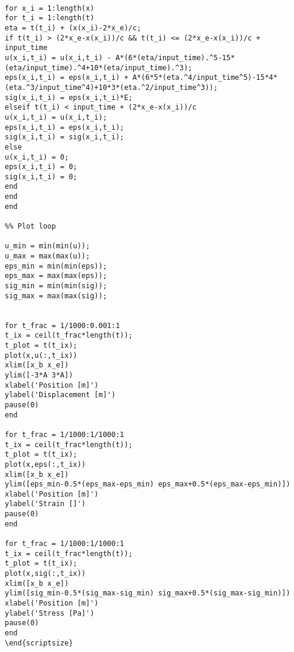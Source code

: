 \begin{lstlisting}[breaklines=true,frame=none]
%% Reflected wave
 
for x_i = 1:length(x)
for t_i = 1:length(t)
eta = t(t_i) + (x(x_i)-2*x_e)/c;
if t(t_i) > (2*x_e-x(x_i))/c && t(t_i) <= (2*x_e-x(x_i))/c + input_time
u(x_i,t_i) = u(x_i,t_i) - A*(6*(eta/input_time).^5-15*(eta/input_time).^4+10*(eta/input_time).^3);
eps(x_i,t_i) = eps(x_i,t_i) + A*(6*5*(eta.^4/input_time^5)-15*4*(eta.^3/input_time^4)+10*3*(eta.^2/input_time^3));
sig(x_i,t_i) = eps(x_i,t_i)*E;
elseif t(t_i) < input_time + (2*x_e-x(x_i))/c
u(x_i,t_i) = u(x_i,t_i);
eps(x_i,t_i) = eps(x_i,t_i);
sig(x_i,t_i) = sig(x_i,t_i);
else
u(x_i,t_i) = 0;
eps(x_i,t_i) = 0;
sig(x_i,t_i) = 0;
end
end
end
 
%% Plot loop
 
u_min = min(min(u));
u_max = max(max(u));
eps_min = min(min(eps));
eps_max = max(max(eps));
sig_min = min(min(sig));
sig_max = max(max(sig));
 
 
for t_frac = 1/1000:0.001:1
t_ix = ceil(t_frac*length(t));
t_plot = t(t_ix);
plot(x,u(:,t_ix))
xlim([x_b x_e])
ylim([-3*A 3*A])
xlabel('Position [m]')
ylabel('Displacement [m]')
pause(0)
end
 
for t_frac = 1/1000:1/1000:1
t_ix = ceil(t_frac*length(t));
t_plot = t(t_ix);
plot(x,eps(:,t_ix))
xlim([x_b x_e])
ylim([eps_min-0.5*(eps_max-eps_min) eps_max+0.5*(eps_max-eps_min)])
xlabel('Position [m]')
ylabel('Strain []')
pause(0)
end
 
for t_frac = 1/1000:1/1000:1
t_ix = ceil(t_frac*length(t));
t_plot = t(t_ix);
plot(x,sig(:,t_ix))
xlim([x_b x_e])
ylim([sig_min-0.5*(sig_max-sig_min) sig_max+0.5*(sig_max-sig_min)])
xlabel('Position [m]')
ylabel('Stress [Pa]')
pause(0)
end
\end{scriptsize}
\end{lstlisting}